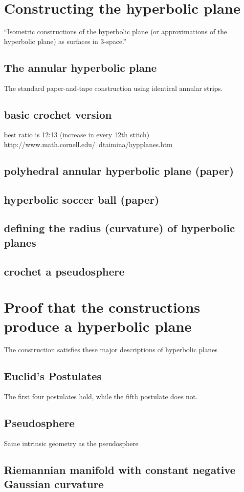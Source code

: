 \documentclass{article}
\begin{document}
\section{Constructing the hyperbolic plane}
``Isometric constructions of the hyperbolic plane (or approximations of the hyperbolic plane) as surfaces in 3-space.'' \cite{crochetplane}
\subsection{The annular hyperbolic plane}
The standard paper-and-tape construction using identical annular strips.
\subsection{basic crochet version}
best ratio is 12:13 (increase in every 12th stitch) http://www.math.cornell.edu/~dtaimina/hypplanes.htm
\subsection{polyhedral annular hyperbolic plane (paper)}
\subsection{hyperbolic soccer ball (paper)}
\subsection{defining the radius (curvature) of hyperbolic planes}
\subsection{crochet a pseudosphere}

\section{Proof that the constructions produce a hyperbolic plane}
The construction satisfies these major descriptions of hyperbolic planes
\subsection{Euclid's Postulates}
The first four postulates hold, while the fifth postulate does not.
\subsection{Pseudosphere}
Same intrinsic geometry as the pseudosphere
\subsection{Riemannian manifold with constant negative Gaussian curvature}
\end{document}
